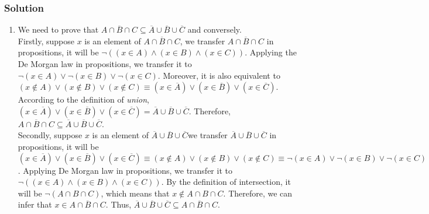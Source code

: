 \documentclass{article}
\theoremstyle{mytheoremstyle}
\theoremstyle{mytheoremstyle}
\theoremstyle{myproblemstyle}
\begin{document}
    \subsubsection*{Solution}
        \begin{enumerate} [label = (\alph*)]
            \item We need to prove that \(\overline{A \cap B \cap C} \subseteq \overline{A} \cup \overline{B} \cup \overline{C}\) and conversely.\\
            
            Firstly, suppose \(x\) is an element of \(\overline{A \cap B \cap C}\), we transfer \(\overline{A \cap B \cap C}\) in propositions, it will be \(\lnot((x \in A) \land (x \in B) \land (x \in C))\). Applying the
            De Morgan law in propositions, we transfer it to \(\lnot(x \in A) \lor \lnot(x \in B) \lor \lnot(x \in C)\). Moreover, it is also equivalent
            to \((x \notin A) \lor (x \notin B) \lor (x \notin C) \equiv (x \in \overline{A}) \lor (x \in \overline{B}) \lor (x \in \overline{C})\). 
            According to the definition of \textit{union}, \((x \in \overline{A}) \lor (x \in \overline{B}) \lor (x \in \overline{C}) = \overline{A} \cup \overline{B} \cup \overline{C}\).
            Therefore, \(\overline{A \cap B \cap C} \subseteq \overline{A} \cup \overline{B} \cup \overline{C}\).\\

            Secondly, suppose \(x\) is an element of \(\overline{A} \cup \overline{B} \cup \overline{C}\)we transfer \(\overline{A} \cup \overline{B} \cup \overline{C}\) in propositions, it will be
            \((x \in \overline{A}) \lor (x \in \overline{B}) \lor (x \in \overline{C}) \equiv (x \notin A) \lor (x \notin B) \lor (x \notin C) \equiv \lnot(x \in A) \lor \lnot(x \in B) \lor \lnot(x \in C)\). 
            Applying De Morgan law in propositions, we transfer it to \(\lnot((x \in A) \land (x \in B) \land (x \in C))\). By 
            the definition of intersection, it will be \(\lnot(A \cap B \cap C)\), which means that \(x \notin A \cap B \cap C\).
            Therefore, we can infer that \(x \in \overline{A \cap B \cap C}\). Thus, \(\overline{A} \cup \overline{B} \cup \overline{C} \subseteq \overline{A \cap B \cap C}\).


\end{enumerate}
\end{document}
